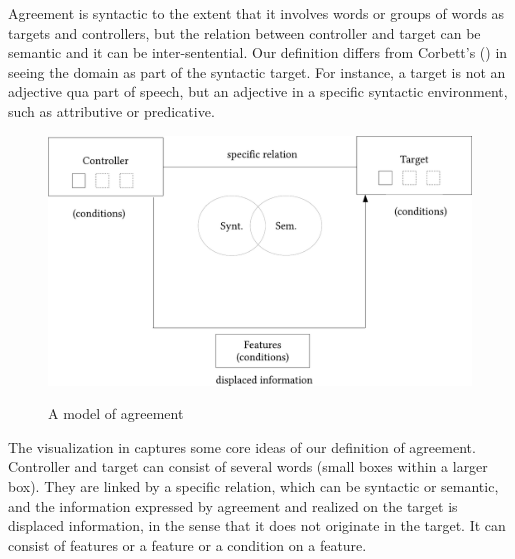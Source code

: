 \documentclass[output=collectionpaper]{langsci/langscibook}
\begin{document}
Agreement is syntactic to the extent that it involves words or groups of words as targets and controllers, but the relation between controller and target can be semantic and it can be inter-sentential. Our definition differs from Corbett's (\citeyear[4]{Corbett2006}) in seeing the domain as part of the syntactic target. For instance, a target is not an adjective qua part of speech, but an adjective in a specific syntactic environment, such as attributive or predicative.

\begin{figure}
\caption{A model of agreement}
\includegraphics[width=\textwidth]{figures/14/fig3}
\label{fig:WDG:3}
\end{figure}

The visualization in  captures some core ideas of our definition of agreement. Controller and target can consist of several words (small boxes within a larger box). They are linked by a specific relation, which can be syntactic or semantic, and the information expressed by agreement and realized on the target is displaced information, in the sense that it does not originate in the target. It can consist of features or a feature or a condition on a feature.
\end{document}
